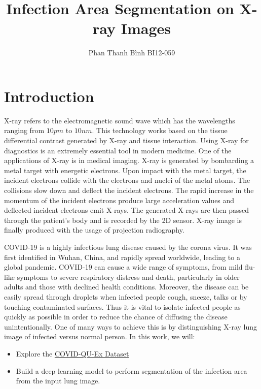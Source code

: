 \documentclass[conference]{IEEEtran}
\title{Infection Area Segmentation on X-ray Images}
\author{Phan Thanh Bình BI12-059}
\begin{document}
\maketitle

\section{Introduction}
X-ray refers to the electromagnetic sound wave which has the wavelengths ranging from $10pm$ to $10nm$. This technology works based on the tissue differential contrast generated by X-ray and tissue interaction. Using X-ray for diagnostics is an extremely essential tool in modern medicine. One of the applications of X-ray is in medical imaging. X-ray is generated by bombarding a metal target with energetic electrons. Upon impact with the metal target, the incident electrons collide with the electrons and nuclei of the metal atoms. The collisions slow down and deflect the incident electrons. The rapid increase in the momentum of the incident electrons produce large acceleration values and deflected incident electrons emit X-rays. The generated X-rays are then passed through the patient's body and is recorded by the 2D sensor. X-ray image is finally produced with the usage of projection radiography.

COVID-19 is a highly infectious lung disease caused by the corona virus. It was first identified in Wuhan, China, and rapidly spread worldwide, leading to a global pandemic. COVID-19 can cause a wide range of symptoms, from mild flu-like symptoms to severe respiratory distress and death, particularly in older adults and those with declined health conditions. Moreover, the disease can be easily spread through droplets when infected people cough, sneeze, talks or by touching contaminated surfaces. Thus it is vital to isolate infected people as quickly as possible in order to reduce the chance of diffusing the disease unintentionally. One of many ways to achieve this is by distinguishing X-ray lung image of infected versus normal person. In this work, we will:
\begin{itemize}
    \item Explore the \href{https://www.kaggle.com/datasets/anasmohammedtahir/covidqu}{COVID-QU-Ex Dataset}
    \item Build a deep learning model to perform segmentation of the infection area from the input lung image.
\end{itemize}
\end{document}
